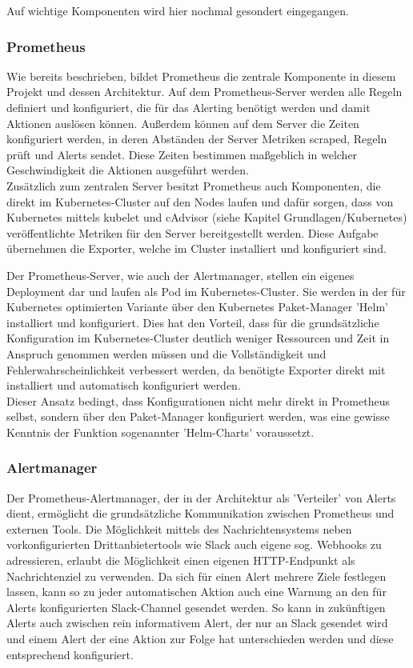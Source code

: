 \documentclass[a4paper,10pt]{scrartcl}
\begin{document}
Auf wichtige Komponenten wird hier nochmal gesondert eingegangen.

\subsubsection{Prometheus}

Wie bereits beschrieben, bildet Prometheus die zentrale Komponente in diesem Projekt und dessen Architektur. Auf dem Prometheus-Server werden alle Regeln definiert und konfiguriert, die für das Alerting benötigt werden und damit Aktionen auslösen können. Außerdem können auf dem Server die Zeiten konfiguriert werden, in deren Abständen der Server Metriken scraped, Regeln prüft und Alerts sendet. Diese Zeiten bestimmen maßgeblich in welcher Geschwindigkeit die Aktionen ausgeführt werden.\\

Zusätzlich zum zentralen Server besitzt Prometheus auch Komponenten, die direkt im Kubernetes-Cluster auf den Nodes laufen und dafür sorgen, dass von Kubernetes mittels kubelet und cAdvisor (siehe Kapitel Grundlagen/Kubernetes) veröffentlichte Metriken für den Server bereitgestellt werden. Diese Aufgabe übernehmen die Exporter, welche im Cluster installiert und konfiguriert sind.

Der Prometheus-Server, wie auch der Alertmanager, stellen ein eigenes Deployment dar und laufen als Pod im Kubernetes-Cluster. Sie werden in der für Kubernetes optimierten Variante über den Kubernetes Paket-Manager 'Helm' installiert und konfiguriert. Dies hat den Vorteil, dass für die grundsätzliche Konfiguration im Kubernetes-Cluster deutlich weniger Ressourcen und Zeit in Anspruch genommen werden müssen und die Vollständigkeit und Fehlerwahrscheinlichkeit verbessert werden, da benötigte Exporter direkt mit installiert und automatisch konfiguriert werden.\\
Dieser Ansatz bedingt, dass Konfigurationen nicht mehr direkt in Prometheus selbst, sondern über den Paket-Manager konfiguriert werden, was eine gewisse Kenntnis der Funktion  sogenannter 'Helm-Charts' voraussetzt.

\subsubsection{Alertmanager}

Der Prometheus-Alertmanager, der in der Architektur als 'Verteiler' von Alerts dient, ermöglicht die grundsätzliche Kommunikation zwischen Prometheus und externen Tools. Die Möglichkeit mittels des Nachrichtensystems neben vorkonfigurierten Drittanbietertools wie Slack auch eigene sog. Webhooks zu adressieren, erlaubt die Möglichkeit einen eigenen HTTP-Endpunkt als Nachrichtenziel zu verwenden. Da sich für einen Alert mehrere Ziele festlegen lassen, kann so zu jeder automatischen Aktion auch eine Warnung an den für Alerts konfigurierten Slack-Channel gesendet werden. So kann in zukünftigen Alerts auch zwischen rein informativem Alert, der nur an Slack gesendet wird und einem Alert der eine Aktion zur Folge hat unterschieden werden und diese entsprechend konfiguriert.\\
\end{document}
